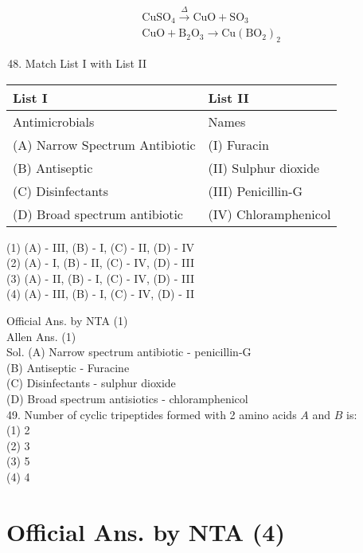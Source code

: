 \documentclass[10pt]{article}
\begin{document}
\[
\begin{aligned}
& \mathrm{CuSO}_{4} \xrightarrow{\Delta} \mathrm{CuO}+\mathrm{SO}_{3} \\
& \mathrm{CuO}+\mathrm{B}_{2} \mathrm{O}_{3} \rightarrow \mathrm{Cu}\left(\mathrm{BO}_{2}\right)_{2}
\end{aligned}
\]

\begin{enumerate}
  \setcounter{enumi}{47}
  \item Match List I with List II
\end{enumerate}

\begin{center}
\begin{tabular}{|l|l|}
\hline
List I & List II \\
\hline
Antimicrobials & Names \\
\hline
(A) Narrow Spectrum Antibiotic & (I) Furacin \\
\hline
(B) Antiseptic & (II) Sulphur dioxide \\
\hline
(C) Disinfectants & (III) Penicillin-G \\
\hline
(D) Broad spectrum antibiotic & (IV) Chloramphenicol \\
\hline
\end{tabular}
\end{center}

(1) (A) - III, (B) - I, (C) - II, (D) - IV\\
(2) (A) - I, (B) - II, (C) - IV, (D) - III\\
(3) (A) - II, (B) - I, (C) - IV, (D) - III\\
(4) (A) - III, (B) - I, (C) - IV, (D) - II

Official Ans. by NTA (1)\\
Allen Ans. (1)\\
Sol. (A) Narrow spectrum antibiotic - penicillin-G\\
(B) Antiseptic - Furacine\\
(C) Disinfectants - sulphur dioxide\\
(D) Broad spectrum antisiotics - chloramphenicol\\
49. Number of cyclic tripeptides formed with 2 amino acids \(A\) and \(B\) is:\\
(1) 2\\
(2) 3\\
(3) 5\\
(4) 4

\section*{Official Ans. by NTA (4)}
\end{document}
